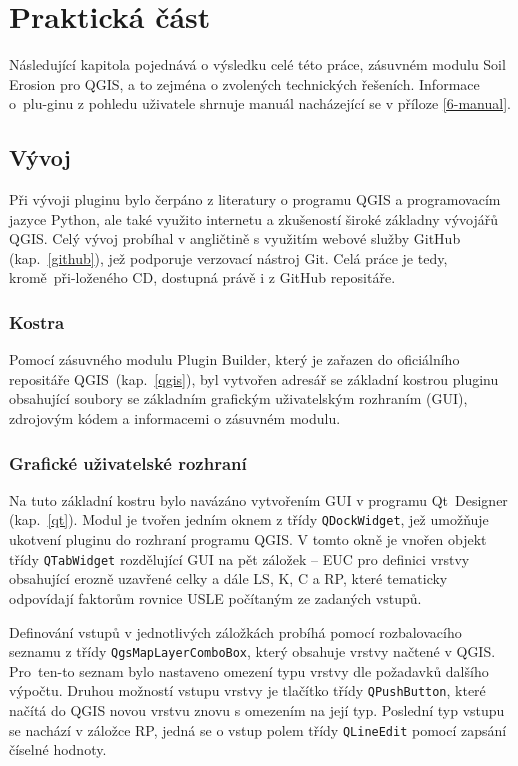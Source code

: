 \chapter{Praktická část}
\label{4-prakticka-cast} Následující kapitola pojednává o výsledku
celé této práce, zásuvném modulu Soil Erosion pro QGIS, a to zejména o
zvolených technických řešeních. Informace o~plu-ginu z pohledu
uživatele shrnuje manuál nacházející se v příloze \ref{6-manual}.
\section{Vývoj} Při vývoji pluginu bylo čerpáno z literatury o
programu QGIS\cite{masteringQgis} a programovacím jazyce
Python\cite{learningPython}\cite{diveIntoPython}, ale také využito
internetu a zkušeností široké základny vývojářů
QGIS\cite{stackexchange}\cite{qgisuserdiscussion}. Celý vývoj probíhal v angličtině s využitím
webové služby GitHub (kap.~\ref{github}), jež podporuje verzovací
nástroj Git. Celá práce je tedy, kromě~při-loženého CD, dostupná právě
i z GitHub repositáře\cite{mujgithub}.
\subsection{Kostra} Pomocí zásuvného modulu Plugin Builder, který je
zařazen do oficiálního repositáře QGIS~(kap.~\ref{qgis}), byl vytvořen
adresář se základní kostrou pluginu obsahující soubory se základním
grafickým uživatelským rozhraním (GUI), zdrojovým kódem a informacemi
o zásuvném modulu.
\subsection{Grafické uživatelské rozhraní} Na tuto základní kostru
bylo navázáno vytvořením GUI v programu
Qt~Designer (kap.~\ref{qt}). Modul je tvořen jedním oknem z třídy
\texttt{QDockWidget}, jež umožňuje ukotvení pluginu do rozhraní
programu QGIS. V tomto okně je vnořen objekt třídy \texttt{QTabWidget}
rozdělující GUI na pět záložek – EUC pro definici vrstvy obsahující
erozně uzavřené celky a dále LS, K, C a RP, které tematicky odpovídají
faktorům rovnice USLE počítaným ze zadaných vstupů.

Definování vstupů v jednotlivých záložkách probíhá pomocí
rozbalovacího seznamu z třídy \texttt{QgsMapLayerComboBox}, který
obsahuje vrstvy načtené v QGIS. Pro~ten-to seznam bylo nastaveno
omezení typu vrstvy dle požadavků dalšího výpočtu.  Druhou možností
vstupu vrstvy je tlačítko třídy \texttt{QPushButton}, které načítá do
QGIS novou vrstvu znovu s omezením na její typ. Poslední typ vstupu se
nachází v záložce RP, jedná se o vstup polem třídy
\texttt{QLineEdit} pomocí zapsání číselné hodnoty.

